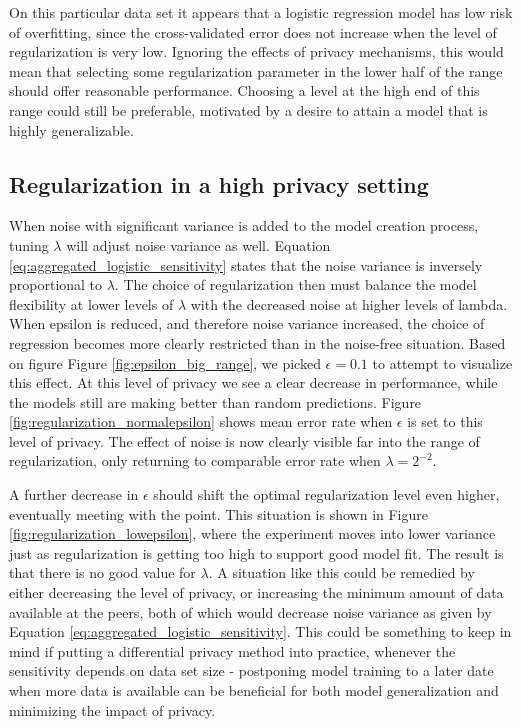 On this particular data set it appears that a logistic regression model has low risk of overfitting, since the cross-validated error does not increase when the level of regularization is very low. Ignoring the effects of privacy mechanisms, this would mean that selecting some regularization parameter in the lower half of the range should offer reasonable performance. Choosing a level at the high end of this range could still be preferable, motivated by a desire to attain a model that is highly generalizable.

\subsection{Regularization in a high privacy setting}

When noise with significant variance is added to the model creation process, tuning $\lambda$ will adjust noise variance as well. Equation \ref{eq:aggregated_logistic_sensitivity} states that the noise variance is inversely proportional to $\lambda$. The choice of regularization then must balance the model flexibility at lower levels of $\lambda$ with the decreased noise at higher levels of lambda. When epsilon is reduced, and therefore noise variance increased, the choice of regression becomes more clearly restricted than in the noise-free situation. Based on figure Figure \ref{fig:epsilon_big_range}, we picked $\epsilon = 0.1$ to attempt to visualize this effect. At this level of privacy we see a clear decrease in performance, while the models still are making better than random predictions. Figure \ref{fig:regularization_normalepsilon} shows mean error rate when $\epsilon$ is set to this level of privacy. The effect of noise is now clearly visible far into the range of regularization, only returning to comparable error rate when $\lambda = 2^{-2}$. 

A further decrease in $\epsilon$ should shift the optimal regularization level even higher, eventually meeting with the point. This situation is shown in Figure \ref{fig:regularization_lowepsilon}, where the experiment moves into lower variance just as regularization is getting too high to support good model fit. The result is that there is no good value for $\lambda$. A situation like this could be remedied by either decreasing the level of privacy, or increasing the minimum amount of data available at the peers, both of which would decrease noise variance as given by Equation \ref{eq:aggregated_logistic_sensitivity}. This could be something to keep in mind if putting a differential privacy method into practice, whenever the sensitivity depends on data set size - postponing model training to a later date when more data is available can be beneficial for both model generalization and minimizing the impact of privacy.

